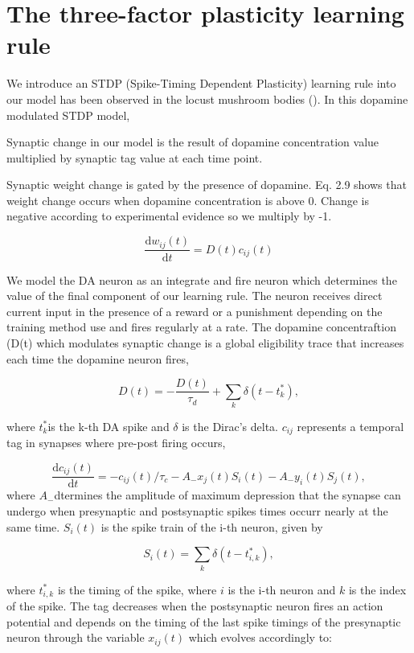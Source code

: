 \section{The three-factor plasticity learning rule}

We introduce an STDP (Spike-Timing Dependent Plasticity) learning
rule into our model has been observed in the locust mushroom bodies
(\citealp{Cassenaer:2007go}). In this dopamine modulated STDP model, 

Synaptic change in our model is the result of dopamine concentration
value multiplied by synaptic tag value at each time point.

Synaptic weight change is gated by the presence of dopamine. Eq. 2.9
shows that weight change occurs when dopamine concentration is above
0. Change is negative according to experimental evidence so we multiply
by -1. 

\begin{equation}
\frac{\text{d}w_{ij}(t)}{\text{d}t}=D(t)c_{ij}(t)
\end{equation}


We model the DA neuron as an integrate and fire neuron which determines
the value of the final component of our learning rule. The neuron
receives direct current input in the presence of a reward or a punishment
depending on the training method use and fires regularly at a rate.
The dopamine concentraftion (D(t) which modulates synaptic change
is a global eligibility trace that increases each time the dopamine
neuron fires,

\begin{equation}
D(t)=-\frac{D(t)}{\tau_{d}}+\sum_{k}\delta(t-t_{k}^{*}),
\end{equation}
\begin{minipage}[t]{1\columnwidth}%
where $t_{k}^{*}$is the k-th DA spike and $\delta$ is the Dirac's
delta. $c_{ij}$ represents a temporal tag in synapses where pre-post
firing occurs,%
\end{minipage}

\begin{equation}
\frac{\text{d}c_{ij}(t)}{\text{d}t}=-c_{ij}(t)/\tau_{c}-A_{-}x_{j}(t)S_{i}(t)-A_{-}y_{i}(t)S_{j}(t),
\end{equation}
where $A_{-}$dtermines the amplitude of maximum depression that the
synapse can undergo when presynaptic and postsynaptic spikes times
occurr nearly at the same time. $S_{i}(t)$ is the spike train of
the i-th neuron, given by

\begin{equation}
S_{i}(t)=\sum_{k}\delta(t-t_{i,k}^{*}),
\end{equation}
\begin{minipage}[t]{1\columnwidth}%
where $t{}_{i,k}^{*}$ is the timing of the spike, where $i$ is the
i-th neuron and $k$ is the index of the spike. The tag decreases
when the postsynaptic neuron fires an action potential and depends
on the timing of the last spike timings of the presynaptic neuron
through the variable $x_{ij}(t)$ which evolves accordingly to: %
\end{minipage}

